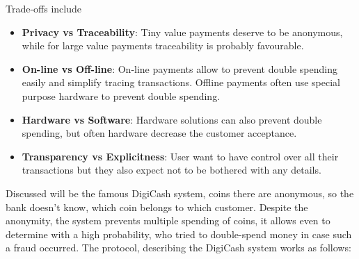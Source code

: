 \documentclass[a4paper, 10 pt, conference]{ieeeconf}
\begin{document}
Trade-offs include
\begin{itemize}
\item \textbf{Privacy vs Traceability}: Tiny value payments deserve to be anonymous, while for large value payments traceability is probably favourable. 
\item \textbf{On-line vs Off-line}: On-line payments allow to prevent double spending easily and simplify tracing transactions. Offline payments often use special purpose hardware to prevent double spending.
\item \textbf{Hardware vs Software}: Hardware solutions can also prevent double spending, but often hardware decrease the customer acceptance. 
\item \textbf{Transparency vs Explicitness}: User want to have control over all their transactions but they also expect not to be bothered with any details. 
\end{itemize}
\vspace{0.5cm}
Discussed will be the famous DigiCash system, coins there are anonymous, so the bank doesn't know, which coin belongs to which customer. Despite the anonymity, the system prevents multiple spending of coins, it allows even to determine with a high probability, who tried to double-spend money in case such a fraud occurred. \pagebreak
The protocol, describing the DigiCash system works as follows:
\end{document}
